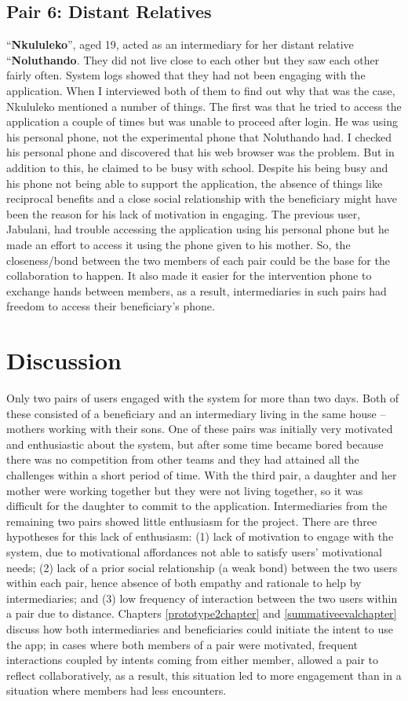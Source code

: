 \subsection*{\textbf{Pair 6: Distant Relatives}}
``\textbf{Nkululeko}'', aged 19, acted as an intermediary for her distant relative ``\textbf{Noluthando}. They did not live close to each other but they saw each other fairly often. System logs showed that they had not been engaging with the application. When I interviewed both of them to find out why that was the case, Nkululeko mentioned a number of things. The first was that he tried to access the application a couple of times but was unable to proceed after login. He was using his personal phone, not the experimental phone that Noluthando had. I checked his personal phone and discovered that his web browser was the problem. But in addition to this, he claimed to be busy with school. Despite his being busy and his phone not being able to support the application, the absence of things like reciprocal benefits and a close social relationship with the beneficiary might have been the reason for his lack of motivation in engaging. The previous user, Jabulani, had trouble accessing the application using his personal phone but he made an effort to access it using the phone given to his mother. So, the closeness/bond between the two members of each pair could be the base for the collaboration to happen. It also made it easier for the intervention phone to exchange hands between members, as a result, intermediaries in such pairs had freedom to access their beneficiary's phone. 
\section{Discussion}
Only two pairs of users engaged with the system for more than two days. Both of these consisted of a beneficiary and an intermediary living in the same house -- mothers working with their sons. One of these pairs was initially very motivated and enthusiastic about the system, but after some time became bored because there was no competition from other teams and they had attained all the challenges within a short period of time. With the third pair, a daughter and her mother were working together but they were not living together, so it was difficult for the daughter to commit to the application. Intermediaries from the remaining two pairs showed little enthusiasm for the project. There are three hypotheses for this lack of enthusiasm: (1) lack of motivation to engage with the system, due to motivational affordances not able to satisfy users' motivational needs; (2) lack of a prior social relationship (a weak bond) between the two users within each pair, hence absence of both empathy and rationale to help by intermediaries; and (3) low frequency of interaction between the two users within a pair due to distance. Chapters \ref{prototype2chapter} and \ref{summativeevalchapter} discuss how both intermediaries and beneficiaries could initiate the intent to use the app; in cases where both members of a pair were motivated, frequent interactions coupled by intents coming from either member, allowed a pair to reflect collaboratively, as a result, this situation led to more engagement than in a situation where members had less encounters. 

